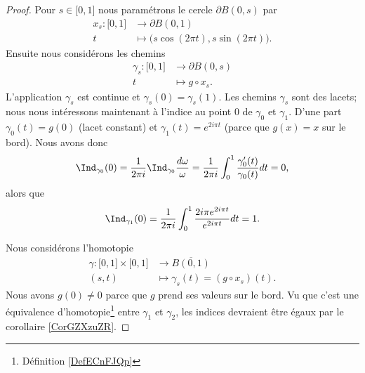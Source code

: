 \begin{proof}
    Pour \( s\in\mathopen[ 0 , 1 \mathclose]\) nous paramétrons le cercle \( \partial B(0,s)\) par
    \begin{equation}
        \begin{aligned}
            x_s\colon \mathopen[ 0 , 1 \mathclose]&\to \partial B(0,1) \\
            t&\mapsto \big( s\cos(2\pi t),s\sin(2\pi t) \big). 
        \end{aligned}
    \end{equation}
    Ensuite nous considérons les chemins
    \begin{equation}
        \begin{aligned}
            \gamma_s\colon \mathopen[ 0 , 1 \mathclose]&\to \partial B(0,s) \\
            t&\mapsto g\circ x_s. 
        \end{aligned}
    \end{equation}
    L'application \( \gamma_s\) est continue et \( \gamma_s(0)=\gamma_s(1)\). Les chemins \( \gamma_s\) sont des lacets; nous nous intéressons maintenant à l'indice au point \( 0\) de \( \gamma_0\) et \( \gamma_1\). D'une part \( \gamma_0(t)=g(0)\) (lacet constant) et \( \gamma_1(t)= e^{2i\pi t}\) (parce que \( g(x)=x\) sur le bord). Nous avons donc
    \begin{equation}
        \Ind_{\gamma_0}(0)=\frac{1}{ 2\pi i }\Ind_{\gamma_0}\frac{ d\omega }{ \omega }=\frac{1}{ 2\pi i }\int_0^1\frac{ \gamma_0'(t) }{ \gamma_0(t) }dt=0,
    \end{equation}
    alors que
    \begin{equation}
        \Ind_{\gamma_1}(0)=\frac{1}{ 2\pi i }\int_0^1\frac{ 2i\pi e^{2i\pi t} }{  e^{2i\pi t} }dt=1.
    \end{equation}
    
    Nous considérons l'homotopie 
    \begin{equation}
        \begin{aligned}
            \gamma\colon \mathopen[ 0 , 1 \mathclose]\times \mathopen[ 0 , 1 \mathclose]&\to \overline{ B(0,1) } \\
            (s,t)&\mapsto \gamma_s(t)=(g\circ x_s)(t). 
        \end{aligned}
    \end{equation}
    Nous avons \( g(0)\neq 0\) parce que \( g\) prend ses valeurs sur le bord. Vu que c'est une équivalence d'homotopie\footnote{Définition \ref{DefECnFJQp}} entre \( \gamma_1\) et \( \gamma_2\), les indices devraient être égaux par le corollaire \ref{CorGZXzuZR}.
\end{proof}

